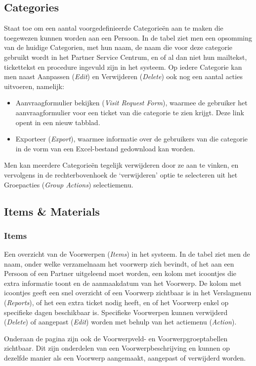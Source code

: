 \documentclass[]{memoir}
\begin{document}
\subsection{Categories} \label{Categories}
Staat toe om een aantal voorgedefinieerde Categorieën aan te maken die toegewezen kunnen worden aan een Persoon.
In de tabel ziet men een opsomming van de huidige Categorien, met hun naam, de naam die voor deze categorie gebruikt wordt in het Partner Service Centrum, en of al dan niet hun mailtekst, tickettekst en procedure ingevuld zijn in het systeem.
Op iedere Categorie kan men naast Aanpassen (\textsl{Edit}) en Verwijderen (\textsl{Delete}) ook nog een aantal acties uitvoeren, namelijk:
\begin{itemize}
	\item Aanvraagformulier bekijken (\textsl{Visit Request Form}), waarmee de gebruiker het aanvraagformulier voor een ticket van die categorie te zien krijgt. Deze link opent in een nieuw tabblad.
	\item Exporteer (\textsl{Export}), waarmee informatie over de gebruikers van die categorie in de vorm van een Excel-bestand gedownload kan worden.
\end{itemize}
Men kan meerdere Categorieën tegelijk verwijderen door ze aan te vinken, en vervolgens in de rechterbovenhoek de `verwijderen' optie te selecteren uit het Groepacties  (\textsl{Group Actions}) selectiemenu.

\subsection{Items \& Materials} \label{ItAndMats}
\subsubsection{Items} \label{Items}
Een overzicht van de Voorwerpen (\textsl{Items}) in het systeem. In de tabel ziet men de naam, onder welke verzamelnaam het voorwerp zich bevindt, of het aan een Persoon of een Partner uitgeleend moet worden, een kolom met icoontjes die extra informatie toont en de aanmaakdatum van het Voorwerp.
De kolom met icoontjes geeft een snel overzicht of een Voorwerp zichtbaar is in het Verslagmenu (\textsl{Reports}), of het een extra ticket nodig heeft, en of het Voorwerp enkel op specifieke dagen beschikbaar is. Specifieke Voorwerpen kunnen verwijderd (\textsl{Delete}) of aangepast (\textsl{Edit}) worden met behulp van het actiemenu (\textsl{Action}).

Onderaan de pagina zijn ook de Voorwerpveld- en Voorwerpgroeptabellen zichtbaar. Dit zijn onderdelen van een Voorwerpbeschrijving en kunnen op dezelfde manier als een Voorwerp aangemaakt, aangepast of verwijderd worden.
\end{document}
